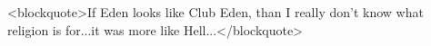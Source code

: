 \begin{post}
	\begin{content}
<blockquote>If Eden looks like Club Eden, than I really don't know what religion is for...it was more like Hell...</blockquote>
	\end{content}
\end{post}
